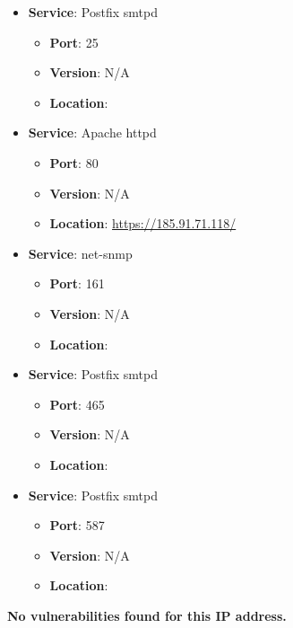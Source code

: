 \documentclass{article}
\begin{document}
\begin{itemize}
    
        \item \textbf{Service}: Postfix smtpd
        \begin{itemize}
            \item \textbf{Port}: 25
            \item \textbf{Version}:  N/A 
            \item \textbf{Location}: \href{  }{  }
        \end{itemize}
    
        \item \textbf{Service}: Apache httpd
        \begin{itemize}
            \item \textbf{Port}: 80
            \item \textbf{Version}:  N/A 
            \item \textbf{Location}: \href{ https://185.91.71.118/ }{ https://185.91.71.118/ }
        \end{itemize}
    
        \item \textbf{Service}: net-snmp
        \begin{itemize}
            \item \textbf{Port}: 161
            \item \textbf{Version}:  N/A 
            \item \textbf{Location}: \href{  }{  }
        \end{itemize}
    
        \item \textbf{Service}: Postfix smtpd
        \begin{itemize}
            \item \textbf{Port}: 465
            \item \textbf{Version}:  N/A 
            \item \textbf{Location}: \href{  }{  }
        \end{itemize}
    
        \item \textbf{Service}: Postfix smtpd
        \begin{itemize}
            \item \textbf{Port}: 587
            \item \textbf{Version}:  N/A 
            \item \textbf{Location}: \href{  }{  }
        \end{itemize}
    
\end{itemize}


\textbf{No vulnerabilities found for this IP address.}




\clearpage
\end{document}
